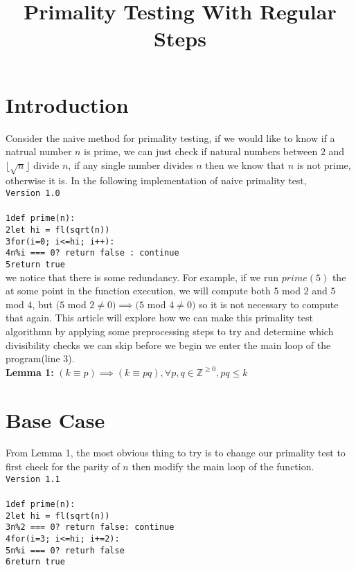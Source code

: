 \documentclass[12pt]{article}
\def\code#1{\texttt{#1}}
\def\ph#1{\phantom{#1}}
\begin{document}
\title{Primality Testing With Regular Steps}
\maketitle

\section{Introduction}
Consider the naive method for primality testing, if we would like to know if a natrual number $n$ is prime, we can just check if natural numbers between $2$ and $\lfloor\sqrt{n}\rfloor$ divide $n$, if any single number divides $n$ then we know that $n$ is not prime, otherwise it is. In the following implementation of naive primality test,\\

\noindent
\code{Version 1.0}\\\\
\code{1\indent def prime(n):}\\
\code{2\indent\ph{..}let hi = fl(sqrt(n))}\\
\code{3\indent\ph{..}for(i=0; i<=hi; i++):}\\
\code{4\indent\ph{....}n\%i === 0? return false : continue}\\
\code{5\indent\ph{..}return true}\\

\noindent we notice that there is some redundancy. For example, if we run $prime(5)$ the at some point in the function execution, we will compute both $5$ mod $2$ and $5$ mod $4$, but $(5$ mod $2\neq 0) \implies (5$ mod $4\neq 0)$ so it is not necessary to compute that again. This article will explore how we can make this primality test algorithmn by applying some preprocessing steps to try and determine which divisibility checks we can skip before we begin we enter the main loop of the program(line 3).\\

\noindent
\textbf{Lemma 1:} $(k\equiv p) \implies (k\equiv pq),\forall p,q\in\mathbb{Z}^{\geq 0}, pq\leq k$

\section{Base Case}
From Lemma 1, the most obvious thing to try is to change our primality test to first check for the parity of $n$ then modify the main loop of the function.\\

\noindent
\code{Version 1.1}\\\\
\code{1\indent def prime(n):}\\
\code{2\indent\ph{..}let hi = fl(sqrt(n))}\\
\code{3\indent\ph{..}n\%2 === 0? return false: continue}\\
\code{4\indent\ph{..}for(i=3; i<=hi; i+=2):}\\
\code{5\indent\ph{....}n\%i === 0? returh false}\\
\code{6\indent\ph{..}return true}\\
\end{document}
